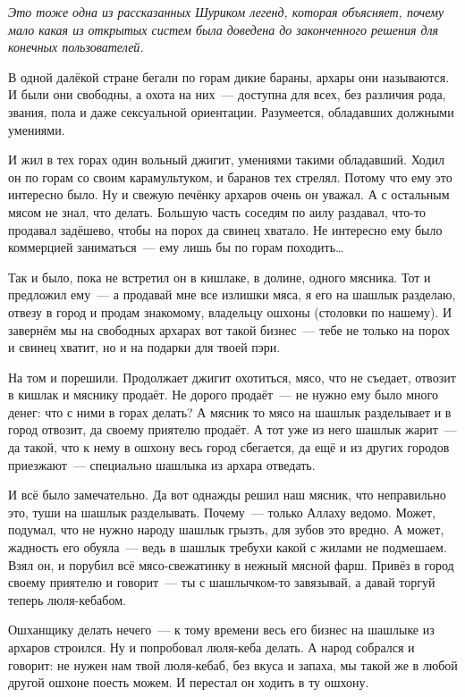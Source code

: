 \textsl{Это тоже одна из рассказанных Шуриком легенд, которая объясняет, почему мало какая из открытых систем была доведена до законченного решения для конечных пользователей.}\medskip

В одной далёкой стране бегали по горам дикие бараны, архары они называются. И были они свободны, а охота на них~--- доступна для всех, без различия рода, звания, пола и даже сексуальной ориентации. Разумеется, обладавших должными умениями.

И жил в тех горах один вольный джигит, умениями такими обладавший. Ходил он по горам со своим карамультуком, и баранов тех стрелял. Потому что ему это интересно было. Ну и свежую печёнку архаров очень он уважал. А с остальным мясом не знал, что делать. Большую часть соседям по аилу раздавал, что-то продавал задёшево, чтобы на порох да свинец хватало. Не интересно ему было коммерцией заниматься~--- ему лишь бы по горам походить\dots

Так и было, пока не встретил он в кишлаке, в долине, одного мясника. Тот и предложил ему~--- а продавай мне все излишки мяса, я его на шашлык разделаю, отвезу в город и продам знакомому, владельцу ошхоны (столовки по нашему). И завернём мы на свободных архарах вот такой бизнес~--- тебе не только на порох и свинец хватит, но и на подарки для твоей пэри.

На том и порешили. Продолжает джигит охотиться, мясо, что не съедает, отвозит в кишлак и мяснику продаёт. Не дорого продаёт~--- не нужно ему было много денег: что с ними в горах делать? А мясник то мясо на шашлык разделывает и в город отвозит, да своему приятелю продаёт. А тот уже из него шашлык жарит~--- да такой, что к нему в ошхону весь город сбегается, да ещё и из других городов приезжают~--- специально шашлыка из архара отведать.

И всё было замечательно. Да вот однажды решил наш мясник, что неправильно это, туши на шашлык разделывать. Почему~--- только Аллаху ведомо. Может, подумал, что не нужно народу шашлык грызть, для зубов это вредно. А может, жадность его обуяла~--- ведь в шашлык требухи какой с жилами не подмешаем. Взял он, и порубил всё мясо-свежатинку в нежный мясной фарш. Привёз в город своему приятелю и говорит~--- ты с шашлычком-то завязывай, а давай торгуй теперь люля-кебабом.

Ошханщику делать нечего~--- к тому времени весь его бизнес на шашлыке из архаров строился. Ну и попробовал люля-кеба делать. А народ собрался и говорит: не нужен нам твой люля-кебаб, без вкуса и запаха, мы такой же в любой другой ошхоне поесть можем. И перестал он ходить в ту ошхону.

